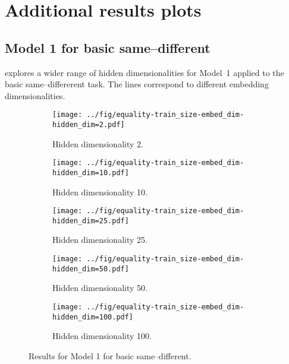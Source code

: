 \newpage


\section{Additional results plots}


\subsection{Model 1 for basic same--different}\label{app:model1-results}

 explores a wider range of hidden dimensionalities for Model~1 applied to the basic same--differerent task. The lines correspond to different embedding dimensionalities.

\begin{figure}[H]
  \centering

  \begin{subfigure}{0.45\linewidth}
    \texttt{[image: ../fig/equality-train\_size-embed\_dim-hidden\_dim=2.pdf]}
    \caption{Hidden dimensionality 2.}
  \end{subfigure}
  \hfill
  \begin{subfigure}{0.45\linewidth}
    \texttt{[image: ../fig/equality-train\_size-embed\_dim-hidden\_dim=10.pdf]}
    \caption{Hidden dimensionality 10.}
  \end{subfigure}

  \vspace{24pt}

  \begin{subfigure}{0.45\linewidth}
    \texttt{[image: ../fig/equality-train\_size-embed\_dim-hidden\_dim=25.pdf]}
    \caption{Hidden dimensionality 25.}
  \end{subfigure}
  \hfill
  \begin{subfigure}{0.45\linewidth}
    \texttt{[image: ../fig/equality-train\_size-embed\_dim-hidden\_dim=50.pdf]}
    \caption{Hidden dimensionality 50.}
  \end{subfigure}

  \vspace{24pt}

  \begin{subfigure}{0.45\linewidth}
    \texttt{[image: ../fig/equality-train\_size-embed\_dim-hidden\_dim=100.pdf]}
    \caption{Hidden dimensionality 100.}
    \label{fig:model1-rep}
  \end{subfigure}
  \caption{Results for Model 1 for basic same--different. }
  \label{fig:model1}
\end{figure}


